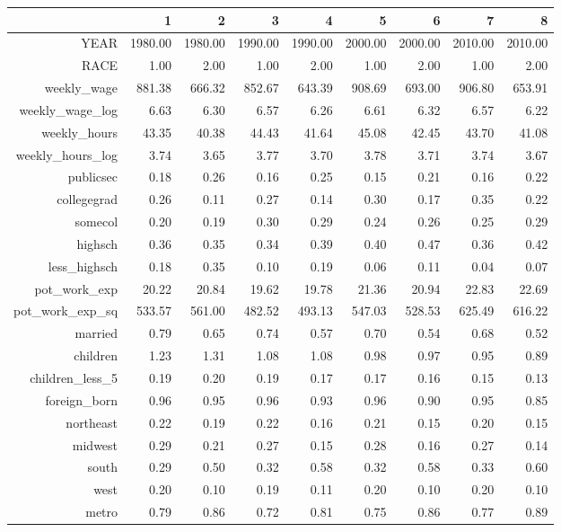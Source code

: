 \begin{table}[ht]
\centering
\begin{tabular}{rrrrrrrrr}
  \hline
 & 1 & 2 & 3 & 4 & 5 & 6 & 7 & 8 \\ 
  \hline
YEAR & 1980.00 & 1980.00 & 1990.00 & 1990.00 & 2000.00 & 2000.00 & 2010.00 & 2010.00 \\ 
  RACE & 1.00 & 2.00 & 1.00 & 2.00 & 1.00 & 2.00 & 1.00 & 2.00 \\ 
  weekly\_wage & 881.38 & 666.32 & 852.67 & 643.39 & 908.69 & 693.00 & 906.80 & 653.91 \\ 
  weekly\_wage\_log & 6.63 & 6.30 & 6.57 & 6.26 & 6.61 & 6.32 & 6.57 & 6.22 \\ 
  weekly\_hours & 43.35 & 40.38 & 44.43 & 41.64 & 45.08 & 42.45 & 43.70 & 41.08 \\ 
  weekly\_hours\_log & 3.74 & 3.65 & 3.77 & 3.70 & 3.78 & 3.71 & 3.74 & 3.67 \\ 
  publicsec & 0.18 & 0.26 & 0.16 & 0.25 & 0.15 & 0.21 & 0.16 & 0.22 \\ 
  collegegrad & 0.26 & 0.11 & 0.27 & 0.14 & 0.30 & 0.17 & 0.35 & 0.22 \\ 
  somecol & 0.20 & 0.19 & 0.30 & 0.29 & 0.24 & 0.26 & 0.25 & 0.29 \\ 
  highsch & 0.36 & 0.35 & 0.34 & 0.39 & 0.40 & 0.47 & 0.36 & 0.42 \\ 
  less\_highsch & 0.18 & 0.35 & 0.10 & 0.19 & 0.06 & 0.11 & 0.04 & 0.07 \\ 
  pot\_work\_exp & 20.22 & 20.84 & 19.62 & 19.78 & 21.36 & 20.94 & 22.83 & 22.69 \\ 
  pot\_work\_exp\_sq & 533.57 & 561.00 & 482.52 & 493.13 & 547.03 & 528.53 & 625.49 & 616.22 \\ 
  married & 0.79 & 0.65 & 0.74 & 0.57 & 0.70 & 0.54 & 0.68 & 0.52 \\ 
  children & 1.23 & 1.31 & 1.08 & 1.08 & 0.98 & 0.97 & 0.95 & 0.89 \\ 
  children\_less\_5 & 0.19 & 0.20 & 0.19 & 0.17 & 0.17 & 0.16 & 0.15 & 0.13 \\ 
  foreign\_born & 0.96 & 0.95 & 0.96 & 0.93 & 0.96 & 0.90 & 0.95 & 0.85 \\ 
  northeast & 0.22 & 0.19 & 0.22 & 0.16 & 0.21 & 0.15 & 0.20 & 0.15 \\ 
  midwest & 0.29 & 0.21 & 0.27 & 0.15 & 0.28 & 0.16 & 0.27 & 0.14 \\ 
  south & 0.29 & 0.50 & 0.32 & 0.58 & 0.32 & 0.58 & 0.33 & 0.60 \\ 
  west & 0.20 & 0.10 & 0.19 & 0.11 & 0.20 & 0.10 & 0.20 & 0.10 \\ 
  metro & 0.79 & 0.86 & 0.72 & 0.81 & 0.75 & 0.86 & 0.77 & 0.89 \\ 
   \hline
\end{tabular}
\end{table}
